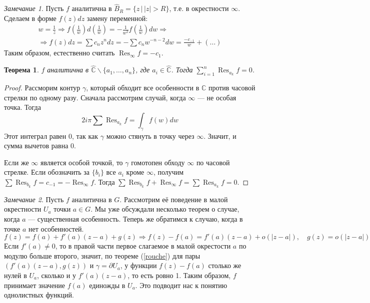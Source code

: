 \documentclass[12pt]{article}
\renewcommand{\C}{\mathbb{C}}
\newcommand{\Res}{\operatorname{Res}}
\newcommand{\Ra}{\Rightarrow}
\newcounter{cnt}
\theoremstyle{thmnote}
\newtheorem{theorem}[cnt]{Теорема}
\theoremstyle{remark}
\newtheorem*{remark}{Замечание}
\theoremstyle{defnote}
\begin{document}
\begin{remark}
    Пусть $f$ аналитична в $\hat{B}_R = \{ z \,|\, |z| > R\}$, т.е. в окрестности $\infty$. Сделаем в форме $f(z)dz$ замену переменной:
    \begin{gather*}
        w = \frac{1}{z} \Ra f\left(\frac{1}{w}\right) d\left(\frac{1}{w}\right) = - \frac{1}{w^2} f\left(\frac{1}{w}\right) dw \Ra \\ \Ra f(z) dz = \sum c_n z^n dz = - \sum c_n w^{-n-2} dw = \frac{- c_{-1}}{w} + (\hdots)
    \end{gather*}
    Таким образом, естественно считать $\Res_\infty f = - c_1$.
\end{remark}

\begin{theorem}
    $f$ аналитична в $\hat{\C} \backslash \{a_1, \hdots, a_n\}$, где $a_i \in \hat{\C}$. Тогда $\sum_{i = 1}^{n} \Res_{a_k} f = 0$.
\end{theorem}
\begin{proof}
    Рассморим контур $\gamma$, который обходит все особенности в $\C$ против часовой стрелки по одному разу. Сначала рассмотрим случай, когда $\infty$ --- не особая точка. Тогда
    \begin{equation*}
        2 i \pi \sum \Res_{a_k} f = \int_\gamma f(w) dw
    \end{equation*}
    Этот интеграл равен 0, так как $\gamma$ можно стянуть в точку через $\infty$. Значит, и сумма вычетов равна 0.

    Если же $\infty$ является особой точкой, то $\gamma$ гомотопен обходу $\infty$ по часовой стрелке. Если обозначить за $\{b_i\}$ все $a_i$ кроме $\infty$, получим $\sum \Res_{b_k} f = c_{-1} = -\Res_\infty f$. Тогда $\sum \Res_{b_k} f + \Res_\infty f = \sum \Res_{a_k} f = 0$.
\end{proof}

\begin{remark}
    Пусть $f$ аналитична в $G$. Рассмотрим её поведение в малой окрестности $U_a$ точки $a \in G$. Мы уже обсуждали несколько теорем о случае, когда $a$ --- существенная особенность. Теперь же обратимся к случаю, когда в точке $a$ нет особенностей.
    \begin{equation*}
        f(z) = f(a) + f'(a)(z - a) + g(z) \Ra f(z) - f(a) = f'(a)(z - a) + o(|z - a|), \quad g(z) = o(|z - a|)
    \end{equation*}
    Если $f'(a) \neq 0$, то в правой части первое слагаемое в малой окрестости $a$ по модулю больше второго, значит, по теореме (\ref{rouche}) для пары $(f'(a)(z - a), g(z))$ и $\gamma = \partial U_a$, у функции $f(z) - f(a)$ столько же нулей в $U_a$, сколько и у $f'(a)(z - a)$, то есть ровно 1. Таким образом, $f$ принимает значение $f(a)$ единожды в $U_a$. Это подводит нас к понятию однолистных функций.
\end{remark}
\end{document}
